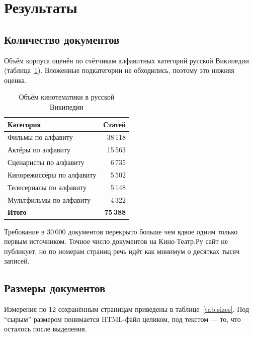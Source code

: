 \section{Результаты}

\subsection*{Количество документов}

Объём корпуса оценён по счётчикам алфавитных категорий русской Википедии
(таблица~\ref{tab:cats}). Вложенные подкатегории не обходились, поэтому это нижняя оценка.

\begin{table}[h]
\centering
\begin{tabular}{|l|r|}
\hline
\textbf{Категория} & \textbf{Статей} \\
\hline
Фильмы по алфавиту & 38\,118 \\
Актёры по алфавиту & 15\,563 \\
Сценаристы по алфавиту & 6\,735 \\
Кинорежиссёры по алфавиту & 5\,502 \\
Телесериалы по алфавиту & 5\,148 \\
Мультфильмы по алфавиту & 4\,322 \\
\hline
\textbf{Итого} & \textbf{75\,388} \\
\hline
\end{tabular}
\caption{Объём кинотематики в русской Википедии}
\label{tab:cats}
\end{table}

Требование в 30\,000 документов перекрыто больше чем вдвое одним только первым
источником. Точное число документов на Кино-Театр.Ру сайт не публикует, но по номерам
страниц речь идёт как минимум о десятках тысяч записей.

\subsection*{Размеры документов}

Измерения по 12 сохранённым страницам приведены в таблице~\ref{tab:sizes}. Под
\enquote{сырым} размером понимается HTML-файл целиком, под текстом --- то, что осталось
после выделения.

